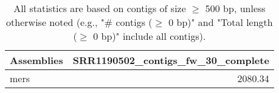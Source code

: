 \documentclass[12pt,a4paper]{article}
\begin{document}
\begin{table}[ht]
\begin{center}
\caption{All statistics are based on contigs of size $\geq$ 500 bp, unless otherwise noted (e.g., "\# contigs ($\geq$ 0 bp)" and "Total length ($\geq$ 0 bp)" include all contigs).}
\begin{tabular}{|l*{1}{|r}|}
\hline
Assemblies & SRR1190502\_contigs\_fw\_30\_complete \\ \hline
mers & 2080.34 \\ \hline
\end{tabular}
\end{center}
\end{table}
\end{document}
